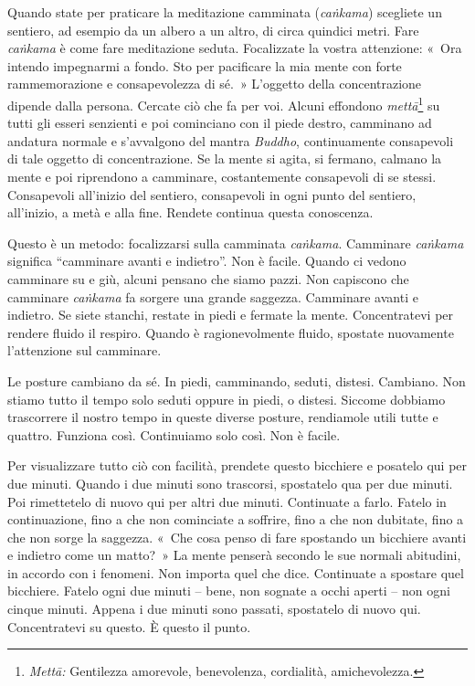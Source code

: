 Quando state per praticare la meditazione camminata (\emph{caṅkama})
scegliete un sentiero, ad esempio da un albero a un altro, di circa
quindici metri. Fare \emph{caṅkama} è come fare meditazione seduta.
Focalizzate la vostra attenzione: «~Ora intendo impegnarmi a fondo. Sto
per pacificare la mia mente con forte rammemorazione e consapevolezza di
sé.~» L'oggetto della concentrazione dipende dalla persona. Cercate ciò
che fa per voi. Alcuni effondono \emph{mettā}\footnote{\emph{Mettā:}
  Gentilezza amorevole, benevolenza, cordialità, amichevolezza.} su
tutti gli esseri senzienti e poi cominciano con il piede destro,
camminano ad andatura normale e s'avvalgono del mantra \emph{Buddho},
continuamente consapevoli di tale oggetto di concentrazione. Se la mente
si agita, si fermano, calmano la mente e poi riprendono a camminare,
costantemente consapevoli di se stessi. Consapevoli all'inizio del
sentiero, consapevoli in ogni punto del sentiero, all'inizio, a metà e
alla fine. Rendete continua questa conoscenza.

Questo è un metodo: focalizzarsi sulla camminata \emph{caṅkama}.
Camminare \emph{caṅkama} significa ``camminare avanti e indietro''. Non
è facile. Quando ci vedono camminare su e giù, alcuni pensano che siamo
pazzi. Non capiscono che camminare \emph{caṅkama} fa sorgere una grande
saggezza. Camminare avanti e indietro. Se siete stanchi, restate in
piedi e fermate la mente. Concentratevi per rendere fluido il respiro.
Quando è ragionevolmente fluido, spostate nuovamente l'attenzione sul
camminare.

Le posture cambiano da sé. In piedi, camminando, seduti, distesi.
Cambiano. Non stiamo tutto il tempo solo seduti oppure in piedi, o
distesi. Siccome dobbiamo trascorrere il nostro tempo in queste diverse
posture, rendiamole utili tutte e quattro. Funziona così. Continuiamo
solo così. Non è facile.

Per visualizzare tutto ciò con facilità, prendete questo bicchiere e
posatelo qui per due minuti. Quando i due minuti sono trascorsi,
spostatelo qua per due minuti. Poi rimettetelo di nuovo qui per altri
due minuti. Continuate a farlo. Fatelo in continuazione, fino a che non
cominciate a soffrire, fino a che non dubitate, fino a che non sorge la
saggezza. «~Che cosa penso di fare spostando un bicchiere avanti e
indietro come un matto?~» La mente penserà secondo le sue normali
abitudini, in accordo con i fenomeni. Non importa quel che dice.
Continuate a spostare quel bicchiere. Fatelo ogni due minuti -- bene,
non sognate a occhi aperti -- non ogni cinque minuti. Appena i due
minuti sono passati, spostatelo di nuovo qui. Concentratevi su questo. È
questo il punto.

